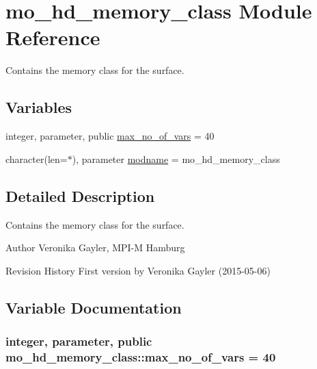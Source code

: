 \hypertarget{namespacemo__hd__memory__class}{}\section{mo\+\_\+hd\+\_\+memory\+\_\+class Module Reference}
\label{namespacemo__hd__memory__class}


Contains the memory class for the surface.  


\subsection*{Variables}
\begin{DoxyCompactItemize}
\item 
integer, parameter, public \hyperlink{namespacemo__hd__memory__class_a43cccc371ea07cf14709f46aedbbed46}{max\+\_\+no\+\_\+of\+\_\+vars} = 40
\item 
character(len=$\ast$), parameter \hyperlink{namespacemo__hd__memory__class_afa4e8202a33ac7bbba47914da1153507}{modname} = \textquotesingle{}mo\+\_\+hd\+\_\+memory\+\_\+class\textquotesingle{}
\end{DoxyCompactItemize}


\subsection{Detailed Description}
Contains the memory class for the surface. 

\begin{DoxyAuthor}{Author}
Veronika Gayler, M\+P\+I-\/\+M Hamburg
\end{DoxyAuthor}
\begin{DoxyParagraph}{Revision History}
First version by Veronika Gayler (2015-\/05-\/06) 
\end{DoxyParagraph}


\subsection{Variable Documentation}
\hypertarget{namespacemo__hd__memory__class_a43cccc371ea07cf14709f46aedbbed46}{}
\subsubsection[{max\+\_\+no\+\_\+of\+\_\+vars}]{\setlength{\rightskip}{0pt plus 5cm}integer, parameter, public mo\+\_\+hd\+\_\+memory\+\_\+class\+::max\+\_\+no\+\_\+of\+\_\+vars = 40}\label{namespacemo__hd__memory__class_a43cccc371ea07cf14709f46aedbbed46}


